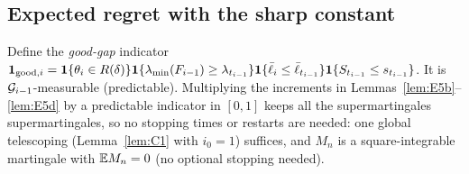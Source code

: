 \subsection{Expected regret with the sharp constant}

Define the \emph{good-gap} indicator $\mathbf 1_{\mathrm{good},i}=\mathbf 1\{\theta_i\in R(\delta)\}\mathbf 1\{\lambda_{\min}(F_{i-1})\ge\lambda_{t_{i-1}}\}\mathbf 1\{\bar\ell_i\le\bar\ell_{t_{i-1}}\}\mathbf 1\{S_{t_{i-1}}\le s_{t_{i-1}}\}$. It is $\mathcal G_{i-1}$-measurable (predictable). Multiplying the increments in Lemmas~\ref{lem:E5b}--\ref{lem:E5d} by a predictable indicator in $[0,1]$ keeps all the supermartingales supermartingales, so no stopping times or restarts are needed: one global telescoping (Lemma~\ref{lem:C1} with $i_0=1$) suffices, and $M_n$ is a square-integrable martingale with $\mathbb{E} M_n=0$ (no optional stopping needed).

